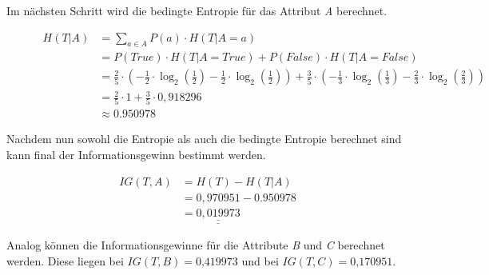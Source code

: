 Im nächsten Schritt wird die bedingte Entropie für das Attribut \textit{A} berechnet.

\begin{figure}[htbp]
    \centering
    \begin{align*}
        H(T\vert A) &= \sum\limits_{a\in A}P(a) \cdot H(T\vert A=a) \\
                    &= P(True) \cdot H(T\vert A=True) + P(False) \cdot H(T\vert A=False) \\
                    &= \frac{2}{5} \cdot \left( -\frac{1}{2} \cdot \log_2\left( \frac{1}{2} \right) - \frac{1}{2} \cdot \log_{2}\left( \frac{1}{2} \right) \right) + \frac{3}{5} \cdot \left( -\frac{1}{3} \cdot \log_{2}\left( \frac{1}{3} \right) - \frac{2}{3} \cdot \log_{2}\left( \frac{2}{3} \right) \right) \\
                    &= \frac{2}{5} \cdot 1 + \frac{3}{5} \cdot 0,918296\\
                    &\approx 0.950978
    \end{align*}
\end{figure}

Nachdem nun sowohl die Entropie als auch die bedingte Entropie berechnet sind kann final der Informationsgewinn bestimmt werden.

\begin{figure}[h]
    \vspace{0.5cm}
    \centering
    \begin{align*}
        IG(T,A) &= H(T) - H(T\vert A) \\
                &= 0,970951 - 0.950978 \\
                &= \underline{\underline{0,019973}}
    \end{align*}
\end{figure}

Analog können die Informationsgewinne für die Attribute \textit{B} und \textit{C} berechnet werden. Diese liegen bei $ IG(T, B) = \textit{0,419973} $ und bei $ IG(T, C) = \textit{0,170951} $.

